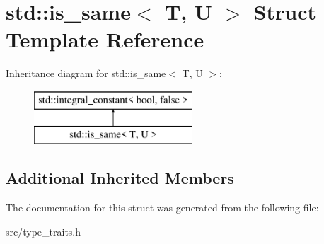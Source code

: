 \hypertarget{structstd_1_1is__same}{}\section{std\+:\+:is\+\_\+same$<$ T, U $>$ Struct Template Reference}
\label{structstd_1_1is__same}
Inheritance diagram for std\+:\+:is\+\_\+same$<$ T, U $>$\+:\begin{figure}[H]
\begin{center}
\leavevmode
\includegraphics[height=2.000000cm]{d8/d4f/structstd_1_1is__same}
\end{center}
\end{figure}
\subsection*{Additional Inherited Members}


The documentation for this struct was generated from the following file\+:\begin{DoxyCompactItemize}
\item 
src/type\+\_\+traits.\+h\end{DoxyCompactItemize}
